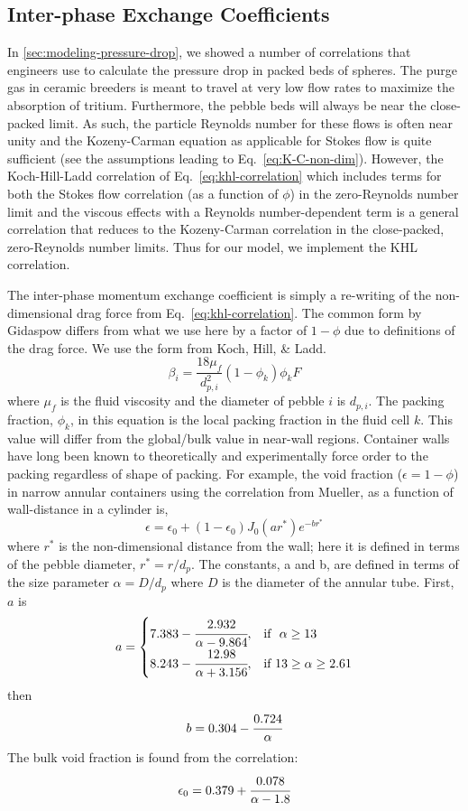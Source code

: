 \subsection{Inter-phase Exchange Coefficients}
In \cref{sec:modeling-pressure-drop}, we showed a number of correlations that engineers use to calculate the pressure drop in packed beds of spheres. The purge gas in ceramic breeders is meant to travel at very low flow rates to maximize the absorption of tritium. Furthermore, the pebble beds will always be near the close-packed limit. As such, the particle Reynolds number for these flows is often near unity and the Kozeny-Carman equation as applicable for Stokes flow is quite sufficient (see the assumptions leading to Eq.~\ref{eq:K-C-non-dim}). However, the Koch-Hill-Ladd correlation of Eq.~\ref{eq:khl-correlation} which includes terms for both the Stokes flow correlation (as a function of $\phi$) in the zero-Reynolds number limit and the viscous effects with a Reynolds number-dependent term is a general correlation that reduces to the Kozeny-Carman correlation in the close-packed, zero-Reynolds number limits. Thus for our model, we implement the KHL correlation.

The inter-phase momentum exchange coefficient is simply a re-writing of the non-dimensional drag force from Eq.~\ref{eq:khl-correlation}. The common form by Gidaspow\cite{gidaspow1994multiphase} differs from what we use here by a factor of $1-\phi$ due to definitions of the drag force. We use the form from Koch, Hill, \& Ladd.\cite{Hoef2005,Benyahia2006}
\begin{equation}\label{eq:interphase-momentum}
	\beta_{i} = \frac{18\mu_f}{d_{p,i}^2}(1-\phi_k)\phi_k F
\end{equation}
where $\mu_f$ is the fluid viscosity and the diameter of pebble $i$ is $d_{p,i}$. The packing fraction, $\phi_k$, in this equation is the local packing fraction in the fluid cell $k$. This value will differ from the global/bulk value in near-wall regions. Container walls have long been known to theoretically and experimentally force order to the packing regardless of shape of packing.\cite{Hunt1990,Benenati1962,Baird1958} For example, the void fraction ($\epsilon = 1-\phi$) in narrow annular containers using the correlation from Mueller, as a function of wall-distance in a cylinder is,\cite{Mueller1999}
\[
\epsilon = \epsilon_0 + (1-\epsilon_0)J_0(ar^*)e^{-br^*}
\]
where $r^*$ is the non-dimensional distance from the wall; here it is defined in terms of the pebble diameter, $r^* = r/d_p$. The constants, a and b, are defined in terms of the size parameter $\alpha = D/d_p$ where $D$ is the diameter of the annular tube. First, $a$ is
\[
    a= 
\begin{cases}
    7.383 - \cfrac{2.932}{\alpha - 9.864}, & \text{if }\  \alpha \geq 13\\
    8.243 - \cfrac{12.98}{\alpha + 3.156}, & \text{if} \ 13 \geq \alpha \geq 2.61
\end{cases}
\]
then
\[
b = 0.304 - \cfrac{0.724}{\alpha}
\]
The bulk void fraction is found from the correlation:
\[
\epsilon_0 = 0.379 + \cfrac{0.078}{\alpha - 1.8}
\]

